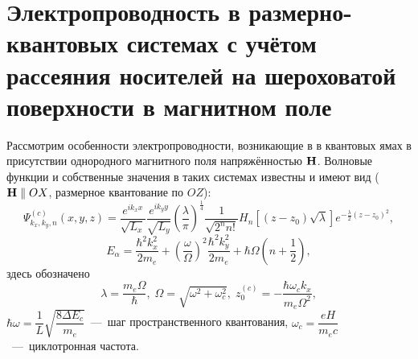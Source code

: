 \section{ Электропроводность в размерно-квантовых системах с учётом рассеяния носителей на шероховатой поверхности в магнитном поле}

Рассмотрим особенности электропроводности, возникающие в в квантовых ямах в присутствии однородного магнитного поля напряжённостью $\boldsymbol{\mathbf{H}}$. Волновые функции и собственные значения в таких системах известны \cite{Tavger1966} и имеют вид ($\boldsymbol{\mathbf{H}} \parallel OX$, размерное квантование по $OZ$):
\begin{equation} \label{eq:32_05_10}
\Psi^{(c)}_{k_x,k_y,n}(x,y,z)=\frac{e^{ik_x x}}{\sqrt{L_x}}\frac{e^{ik_y y}}{\sqrt{L_y}}{\left(\frac{\lambda }{\pi }\right)}^{\frac{1}{4}}\frac{1}{\sqrt{2^n n!}}H_n\left[(z-z_0)\sqrt{\lambda }\right]e^{-\frac{\lambda }{2}(z-z_0)^2},
\end{equation}
\begin{equation} \label{eq:32_05_20}
E_{\alpha }=\frac{\hbar^2 k^2_x}{2m_e}+{\left(\frac{\omega }{\Omega }\right)}^2\frac{\hbar^2 k^2_y}{2m_e} +\hbar\Omega \left(n+\frac{1}{2}\right),
\end{equation}
здесь обозначено
\[
\lambda =\frac{m_e\Omega }{\hbar },\;
\Omega =\sqrt{\omega^2+\omega^2_c},\;
z^{(c)}_0=-\frac{\hbar \omega_c k_x}{m_e \Omega^2},
\]
$\hbar \omega =\dfrac{1}{L} \sqrt{\dfrac{8\Delta E_c }{m_e}} $~---~шаг пространственного квантования,
$\omega_c=\dfrac{eH}{m_e c}$~---~циклотронная частота.

